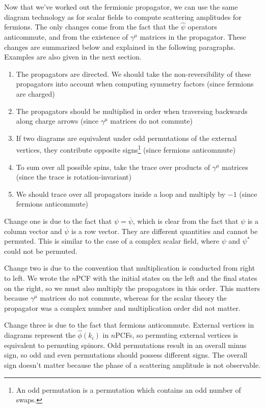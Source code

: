 Now that we've worked out the fermionic propagator, we can use the same diagram technology as for scalar fields to compute scattering amplitudes for fermions. The only changes come from the fact that the $\hat \psi$ operators anticommute, and from the existence of $\gamma^\mu$ matrices in the propagator. These changes are summarized below and explained in the following paragraphs. Examples are also given in the next section.
\begin{enumerate}
  \item The propagators are directed. We should take the non-reversibility of these propagators into account when computing symmetry factors (since fermions are charged)
  \item The propagators should be multiplied in order when traversing backwards along charge arrows (since $\gamma^\mu$ matrices do not commute)
  \item If two diagrams are equivalent under odd permutations of the external vertices, they contribute opposite signs\footnote{An odd permutation is a permutation which contains an odd number of swaps.} (since fermions anticommute)
  \item To sum over all possible spins, take the trace over products of $\gamma^\mu$ matrices (since the trace is rotation-invariant)
  \item We should trace over all propagators inside a loop and multiply by $-1$ (since fermions anticommute)
\end{enumerate}

Change one is due to the fact that $\psi=\overline \psi$, which is clear from the fact that $\psi$ is a column vector and $\overline \psi$ is a row vector. They are different quantities and cannot be permuted. This is similar to the case of a complex scalar field, where $\psi$ and $\psi^*$ could not be permuted.

Change two is due to the convention that multiplication is conducted from right to left. We wrote the $n$PCF with the initial states on the left and the final states on the right, so we must also multiply the propagators in this order. This matters because $\gamma^\mu$ matrices do not commute, whereas for the scalar theory the propagator was a complex number and multiplication order did not matter.

Change three is due to the fact that fermions anticommute. External vertices in diagrams represent the $\hat \phi(k_i)$ in $n$PCFs, so permuting external vertices is equivalent to permuting spinors. Odd permutations result in an overall minus sign, so odd and even permutations should possess different signs. The overall sign doesn't matter because the phase of a scattering amplitude is not observable.

